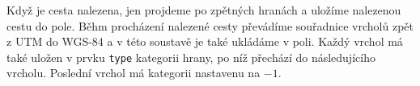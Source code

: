 Když je cesta nalezena, jen projdeme po zpětných hranách a uložíme nalezenou
cestu do pole. Běhm procházení nalezené cesty převádíme souřadnice vrcholů zpět
z UTM do WGS-84 a v této soustavě je také ukládáme v poli. Každý vrchol má také
uložen v prvku \verb|type| kategorii hrany, po níž přechází do následujícího
vrcholu. Poslední vrchol má kategorii nastavenu na $-1$.
